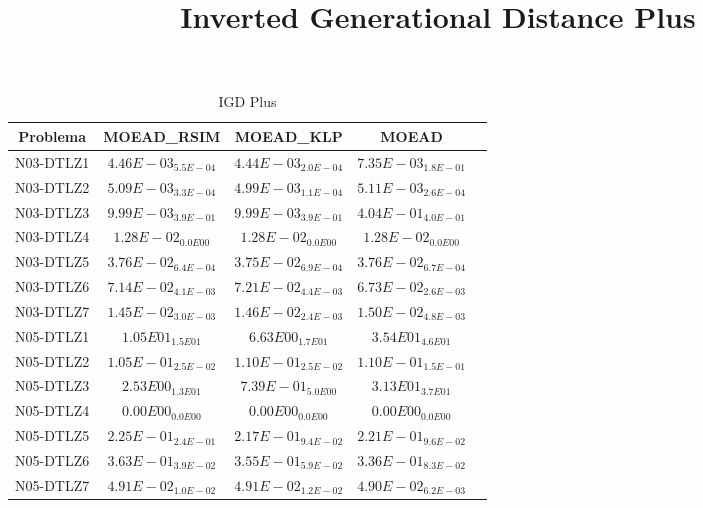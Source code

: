 \documentclass{article}
\title{Inverted Generational Distance Plus}
\author{}
\begin{document}
\maketitle
\begin{table*}[ht!]
\scriptsize
\caption{IGD Plus}
\centering\begin{tabular}{|c||c||c||c||c|} \hline
Problema &MOEAD_RSIM &MOEAD_KLP &MOEAD\\\hline
N03-DTLZ1 &\cellcolor{gray25}$4.46E-03_{5.5E-04}$ &\cellcolor{gray95}$4.44E-03_{2.0E-04}$ &$7.35E-03_{1.8E-01}$\\ 
\hline
N03-DTLZ2 &\cellcolor{gray25}$5.09E-03_{3.3E-04}$ &\cellcolor{gray95}$4.99E-03_{1.1E-04}$ &$5.11E-03_{2.6E-04}$\\ 
\hline
N03-DTLZ3 &\cellcolor{gray95}$9.99E-03_{3.9E-01}$ &\cellcolor{gray25}$9.99E-03_{3.9E-01}$ &$4.04E-01_{4.0E-01}$\\ 
\hline
N03-DTLZ4 &\cellcolor{gray95}$1.28E-02_{0.0E00}$ &\cellcolor{gray25}$1.28E-02_{0.0E00}$ &$1.28E-02_{0.0E00}$\\ 
\hline
N03-DTLZ5 &$3.76E-02_{6.4E-04}$ &\cellcolor{gray95}$3.75E-02_{6.9E-04}$ &\cellcolor{gray25}$3.76E-02_{6.7E-04}$\\ 
\hline
N03-DTLZ6 &\cellcolor{gray25}$7.14E-02_{4.1E-03}$ &$7.21E-02_{4.4E-03}$ &\cellcolor{gray95}$6.73E-02_{2.6E-03}$\\ 
\hline
N03-DTLZ7 &\cellcolor{gray95}$1.45E-02_{3.0E-03}$ &\cellcolor{gray25}$1.46E-02_{2.4E-03}$ &$1.50E-02_{4.8E-03}$\\ 
\hline
N05-DTLZ1 &\cellcolor{gray25}$1.05E01_{1.5E01}$ &\cellcolor{gray95}$6.63E00_{1.7E01}$ &$3.54E01_{4.6E01}$\\ 
\hline
N05-DTLZ2 &\cellcolor{gray95}$1.05E-01_{2.5E-02}$ &\cellcolor{gray25}$1.10E-01_{2.5E-02}$ &$1.10E-01_{1.5E-01}$\\ 
\hline
N05-DTLZ3 &\cellcolor{gray25}$2.53E00_{1.3E01}$ &\cellcolor{gray95}$7.39E-01_{5.0E00}$ &$3.13E01_{3.7E01}$\\ 
\hline
N05-DTLZ4 &\cellcolor{gray95}$0.00E00_{0.0E00}$ &\cellcolor{gray25}$0.00E00_{0.0E00}$ &$0.00E00_{0.0E00}$\\ 
\hline
N05-DTLZ5 &$2.25E-01_{2.4E-01}$ &\cellcolor{gray95}$2.17E-01_{9.4E-02}$ &\cellcolor{gray25}$2.21E-01_{9.6E-02}$\\ 
\hline
N05-DTLZ6 &$3.63E-01_{3.9E-02}$ &\cellcolor{gray25}$3.55E-01_{5.9E-02}$ &\cellcolor{gray95}$3.36E-01_{8.3E-02}$\\ 
\hline
N05-DTLZ7 &$4.91E-02_{1.0E-02}$ &\cellcolor{gray25}$4.91E-02_{1.2E-02}$ &\cellcolor{gray95}$4.90E-02_{6.2E-03}$\\ 

\end{tabular}
\end{table*}
\end{document}

